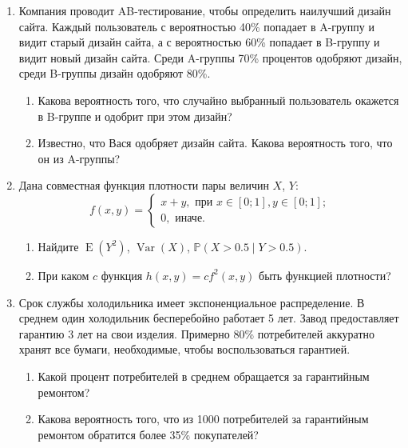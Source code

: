 \documentclass[12pt]{article}
\DeclareMathOperator{\Var}{Var}
\DeclareMathOperator{\E}{E}
\def \P{\mathbb{P}}
\begin{document}
\begin{enumerate}

\item Компания проводит AB-тестирование, чтобы определить наилучший дизайн сайта. 
Каждый пользователь с вероятностью 40\% попадает в A-группу и видит старый дизайн сайта, 
а с вероятностью 60\% попадает в B-группу и видит новый дизайн сайта. 
Среди A-группы 70\% процентов одобряют дизайн, среди B-группы дизайн одобряют 80\%.

\begin{enumerate}
  \item Какова вероятность того, что случайно выбранный пользователь окажется в B-группе и одобрит при этом дизайн?
  \item Известно, что Вася одобряет дизайн сайта. Какова вероятность того, что он из A-группы?
\end{enumerate}

  \item Дана совместная функция плотности пары величин $X$, $Y$:
  \[
    f(x, y) = \begin{cases} 
      x+ y, \text{ при } x\in [0;1], y\in [0;1]; \\
      0, \text{ иначе.}
    \end{cases}
  \]
\begin{enumerate}
  \item Найдите $\E(Y^2)$, $\Var(X)$, $\P(X > 0.5 \mid Y > 0.5)$.
  \item При каком $c$ функция $h(x, y) = c f^2(x, y)$ быть функцией плотности? 
\end{enumerate}


\item Срок службы холодильника имеет экспоненциальное распределение. В среднем один холодильник
бесперебойно работает 5 лет. Завод предоставляет гарантию 3 лет на свои изделия. 
Примерно 80\% потребителей аккуратно хранят все бумаги, необходимые, чтобы воспользоваться
гарантией.

\begin{enumerate}
  \item Какой процент потребителей в среднем обращается за гарантийным ремонтом?
  \item Какова вероятность того, что из 1000 потребителей за гарантийным ремонтом обратится более 35\%
покупателей?
\end{enumerate}

\end{enumerate}
\end{document}

